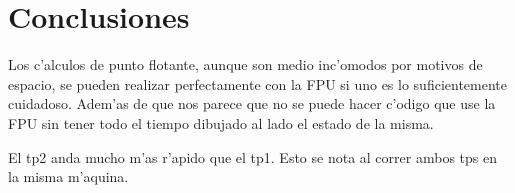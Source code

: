 \section{Conclusiones}

Los c'alculos de punto flotante, aunque son medio inc'omodos por motivos de
espacio, se pueden realizar perfectamente con la FPU si uno es lo
suficientemente cuidadoso. Adem'as de que nos parece que no se puede hacer
c'odigo que use la FPU sin tener todo el tiempo dibujado al lado el estado de la
misma.

El tp2 anda mucho m'as r'apido que el tp1. Esto se nota al correr ambos tps en
la misma m'aquina.

